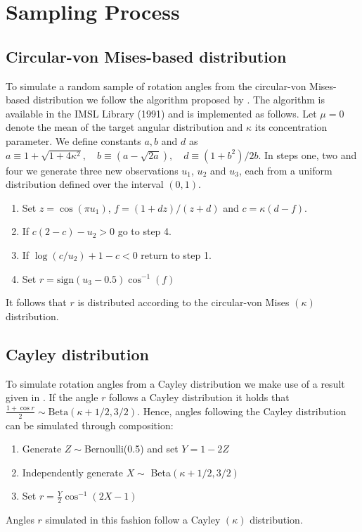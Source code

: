 \appendix

\section{Sampling Process}
\label{sec:appendix1}
\subsection{Circular-von Mises-based distribution}

To simulate a random sample of rotation angles from the circular-von Mises-based distribution we follow the  algorithm proposed by \citet{best79}.  The algorithm is available in the IMSL Library (1991) and is implemented as follows.  Let $\mu=0$ denote the mean of the target angular distribution and $\kappa$ its concentration parameter.  We define constants $a, b$ and $d$ as
$a\equiv 1+\sqrt{1+4\kappa^2},\quad b\equiv(a-\sqrt{2a}),\quad d\equiv(1+b^2)/2b.$
In steps one, two and four we generate three new observations $u_1$, $u_2$ and $u_3$,  each from a uniform distribution defined over the interval $(0,1)$. 
\begin{enumerate}
\item Set $z=\cos(\pi u_1)$, $f=(1+dz)/(z+d)$ and $c=\kappa(d-f)$.
\item If $c(2-c)-u_2>0$ go to step 4.
\item If $\log(c/u_2)+1-c<0$ return to step 1.
\item Set $r=\text{sign}(u_3-0.5)\cos^{-1}(f)$
\end{enumerate}
It follows that  $r$ is distributed according to the circular-von Mises $(\kappa)$ distribution.

\subsection{Cayley distribution}%

To simulate rotation angles from a Cayley distribution we make use of a result given in \citet{leon06}. If the angle $r$ follows a Cayley distribution it holds that $\frac{1+\cos r}{2} \sim \text{Beta}(\kappa+1/2, 3/2)$.  Hence, angles following the Cayley distribution can be simulated through composition: 
\begin{enumerate}
\item Generate $Z\sim$Bernoulli(0.5) and set  $Y=1-2Z$
\item Independently generate $X\sim$ Beta$(\kappa+1/2, 3/2)$
\item Set $r= \frac{Y}{2}\cos^{-1}(2X-1)$
\end{enumerate}
Angles $r$ simulated in this fashion follow a Cayley $(\kappa)$ distribution.


